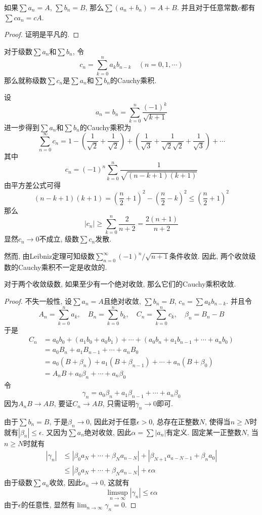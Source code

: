 \documentclass[cn,12pt,math=mtpro2,citestyle=gb7714-2015,bibstyle=gb7714-2015,twocol]{elegantbook}
\newcommand{\limn}{\lim_{n\to\infty}}
\begin{document}
\begin{theorem}
  如果$\sum a_n=A$, $\sum b_n=B$, 那么$\sum(a_n+b_n)=A+B$. 并且对于任意常数$c$都有$\sum ca_n=cA$.
\end{theorem}
\begin{proof}
  证明是平凡的.
\end{proof}
\begin{definition}
对于级数$\sum a_n$和$\sum b_n$, 令
$$c_n=\sum_{k=0}^{n}a_kb_{n-k}\quad (n=0,1,\cdots)$$
那么就称级数$\sum c_n$是$\sum a_n$和$\sum b_n$的Cauchy乘积.
\end{definition}
\begin{example}
设
$$a_n=b_n=\sum_{k=0}^{n}\frac{(-1)^k}{\sqrt{k+1}}$$
进一步得到$\sum a_n$和$\sum b_n$的Cauchy乘积为
$$\sum_{n=0}^{\infty}c_n=1-\left(\frac{1}{\sqrt{2}}+\frac{1}{\sqrt{2}}\right)+\left(\frac{1}{\sqrt{3}}+\frac{1}{\sqrt{2}\sqrt{2}}+\frac{1}{\sqrt{3}}\right)+\cdots$$
其中
$$c_n=(-1)^n\sum_{k=0}^{n}\frac{1}{\sqrt{(n-k+1)(k+1)}}$$
由平方差公式可得
$$(n-k+1)(k+1)=\left(\frac{n}{2}+1\right)^2-\left(\frac{n}{2}-k\right)^2\leq\left(\frac{n}{2}+1\right)^2$$
那么
$$|c_n|\geq \sum_{k=0}^{n}\frac{2}{n+2}=\frac{2(n+1)}{n+2}$$
显然$c_n\rightarrow 0$不成立, 级数$\sum c_n$发散.

然而, 由Leibniz定理可知级数$\sum_{n=0}^{\infty}(-1)^n/\sqrt{n+1}$条件收敛. 因此, 两个收敛级数的Cauchy乘积不一定是收敛的.
\end{example}
\begin{theorem}[Mertens定理]
  对于两个收敛级数, 如果至少有一个绝对收敛, 那么它们的Cauchy乘积收敛.
\end{theorem}
\begin{proof}
  不失一般性, 设$\sum a_n=A$且绝对收敛, $\sum b_n=B$, $c_n=\sum a_kb_{n-k}$. 并且令
  $$A_n=\sum_{k=0}^{n}a_k,\quad B_n=\sum_{k=0}^{n}b_k,\quad C_n=\sum_{k=0}^{n}c_k, \quad \beta_n=B_n-B$$
  于是
  \begin{align*}
  C_n&=a_0b_0+(a_1b_0+a_0b_1)+\cdots+(a_0b_n+a_1b_{n-1}+\cdots+a_nb_0) \\
  &=a_0B_n+a_1B_{n-1}+\cdots+a_nB_0 \\
  &=a_0(B+\beta_n)+a_1(B+\beta_{n-1})+\cdots+a_n(B+\beta_0) \\
  &=A_nB+a_0\beta_n+\cdots+a_n\beta_0
  \end{align*}
  令
  $$\gamma_n=a_0\beta_n+a_1\beta_{n-1}+\cdots+a_n\beta_0$$
  因为$A_nB\rightarrow AB$, 要证$C_n\rightarrow AB$, 只需证明$\gamma_n\rightarrow 0$即可.

  由于$\sum b_n=B$, 于是$\beta_n\rightarrow0$, 因此对于任意$\epsilon>0$, 总存在正整数$N$, 使得当$n\geq N$时就有$|\beta_n|\leq\epsilon$. 又因为$\sum a_n$绝对收敛, 因此$\alpha=\sum |a_n|$有定义. 固定某一正整数$N$, 当$n\geq N$时就有
  \begin{align*}
  |\gamma_n|&\leq |\beta_0a_N+\cdots+\beta_Na_{n-N}|+|\beta_{N+1}a_{a-N-1}+\beta_na_0| \\
  &\leq |\beta_0a_N+\cdots+\beta_Na_{n-N}|+\epsilon\alpha
  \end{align*}
  由于级数$\sum a_n$收敛, 因此$a_n\rightarrow 0$, 这就有
  $$\limsup_{n\to\infty} |\gamma_n|\leq \epsilon\alpha$$
  由于$\epsilon$的任意性, 显然有$\displaystyle \limn \gamma_n=0$.

\end{proof}
\end{document}
